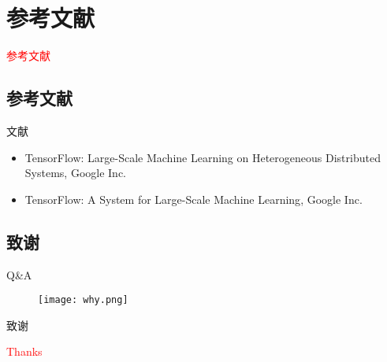 \section{参考文献}
\label{sec:reference}

\begin{frame}
  \begin{center}
    \Huge{\textcolor{red}{参考文献}}
  \end{center}
\end{frame}

\subsection{参考文献}

\begin{frame}{文献}
    \begin{itemize}
    \item \alert{TensorFlow: Large-Scale Machine Learning on Heterogeneous Distributed Systems}, Google Inc.
    \item \alert{TensorFlow: A System for Large-Scale Machine Learning}, Google Inc.
    \end{itemize}
\end{frame}

\subsection{致谢}

\begin{frame}{Q\&A}
  \begin{figure}
    \centering
    \texttt{[image: why.png]}
  \end{figure}
\end{frame}

\begin{frame}{致谢}
  \begin{center}
    \Huge{\textcolor{red}{Thanks}}
  \end{center}
\end{frame}
